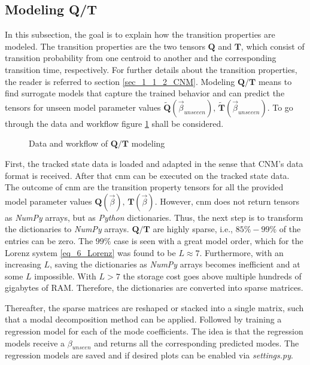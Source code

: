\subsection{Modeling Q/T}
\label{subsec_2_4_2_QT}
In this subsection, the goal is to explain how the transition properties are modeled. 
The transition properties are the two tensors $\bm Q$ and $\bm T$, which consist of transition probability from one centroid to another and the corresponding transition time, respectively.
For further details about the transition properties, the reader is referred to section \ref{sec_1_1_2_CNM}.
Modeling $\bm Q / \bm T$ means to find surrogate models that capture the trained behavior and can predict the tensors for unseen model parameter values $\bm{\tilde{Q}}(\vec{\beta}_{unseeen}) ,\, \bm{\tilde{T}}(\vec{\beta}_{unseeen})$.
To go through the data and workflow figure \ref{fig_44} shall be considered.\newline


\begin{figure} [!h]
    \hspace*{-4cm} 
    \resizebox{1.2\textwidth}{!}{
    
    }
    \caption{Data and workflow of $\bm Q / \bm T$ modeling}
    \label{fig_44}
\end{figure}

First, the tracked state data is loaded and adapted in the sense that CNM's data format is received. After that \gls{cnm} can be executed on the tracked state data.
The outcome of \gls{cnm} are the transition property tensors for all the provided model parameter values $\bm Q(\vec{\beta}) ,\, \bm T(\vec{\beta})$.
However, \gls{cnm} does not return tensors as \emph{NumPy} \cite{harris2020array} arrays, but as \emph{Python} dictionaries. 
Thus, the next step is to transform the dictionaries to \emph{NumPy} arrays.
$\bm Q / \bm T$ are highly sparse, i.e., $85 \% - 99\%$ of the entries can be zero. 
The $99\%$ case is seen with a great model order, which for the Lorenz system \eqref{eq_6_Lorenz} was found to be $L \approx 7$.
Furthermore, with an increasing $L$, saving the dictionaries as \emph{NumPy} arrays becomes inefficient and at some $L$ impossible. With $L>7$ the storage cost goes above multiple hundreds of gigabytes of RAM.
Therefore, the dictionaries are converted into sparse matrices. \newline 

Thereafter, the sparse matrices are reshaped or stacked into a single matrix, such that a modal decomposition method can be applied.
Followed by training a regression model for each of the mode coefficients.
The idea is that the regression models receive a $\beta_{unseen}$ and returns all the corresponding predicted modes. 
The regression models are saved and if desired plots can be enabled via \emph{settings.py}. \newline 

